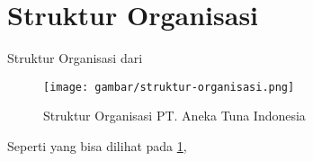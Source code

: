 \section{Struktur Organisasi}
\vspace{1ex}

Struktur Organisasi dari \lipsum[1]
\vspace{0.5ex}

\begin{figure} [ht] \centering
  \texttt{[image: gambar/struktur-organisasi.png]}
  \caption{Struktur Organisasi PT. Aneka Tuna Indonesia}
	\label{fig:strukturOrganisasi}
\end{figure}

Seperti yang bisa dilihat pada \ref{fig:strukturOrganisasi}, \lipsum[1]
\vspace{0.5ex}
